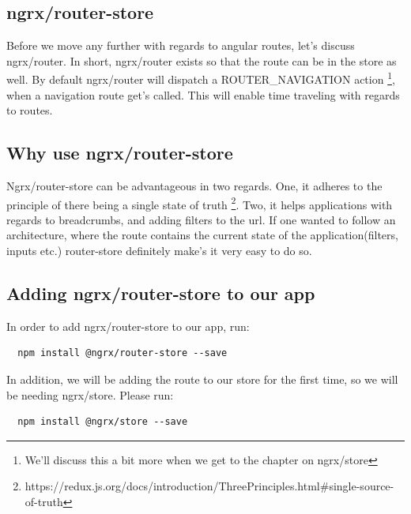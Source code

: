\subsection{ ngrx/router-store }

Before we move any further with regards to angular routes, let's discuss
ngrx/router. In short, ngrx/router exists so that the route can be in the store
as well. By default ngrx/router will dispatch a ROUTER\_NAVIGATION action
\footnote{We'll discuss this a bit more when we get to the chapter on ngrx/store},
when a navigation route get's called. This will enable time traveling with
regards to routes.

\subsection{ Why use ngrx/router-store }

Ngrx/router-store can be advantageous in two regards. One, it adheres to the
principle of there being a single state of truth \footnote{https://redux.js.org/docs/introduction/ThreePrinciples.html\#single-source-of-truth}.
Two, it helps applications with regards to breadcrumbs, and adding filters to the
url. If one wanted to follow an architecture, where the route contains the current
state of the application(filters, inputs etc.) router-store definitely make's it
very easy to do so.

\subsection{ Adding ngrx/router-store to our app }

In order to add ngrx/router-store to our app, run:
\begin{verbatim}
  npm install @ngrx/router-store --save
\end{verbatim}

In addition, we will be adding the route to our store for the first time, so we 
will be needing ngrx/store. Please run:
\begin{verbatim}
  npm install @ngrx/store --save
\end{verbatim}
